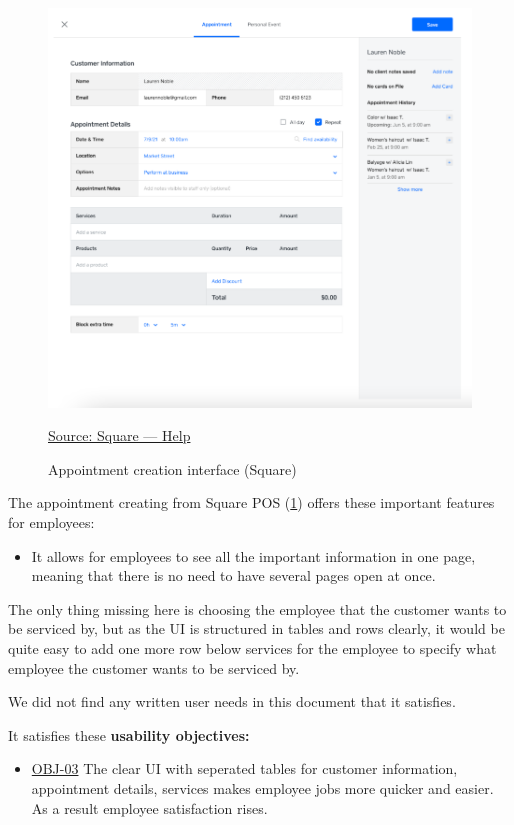 \documentclass[]{VUMIFTemplateClass}
\begin{document}
\begin{figure}[H]
    \centering
    \includegraphics[width=\textwidth]{images/examples/appointment_creating_square.png}
    \caption{Appointment creation interface (Square)}
    \href{https://squareup.com/help/us/en}{Source: Square — Help}
    \label{fig:appointment-creation}
\end{figure}

The appointment creating from Square POS (\ref{fig:appointment-creation}) offers these important features for employees:

\begin{itemize}
    \item It allows for employees to see all the important information in one page, meaning that there is no need to have several pages open at once.
\end{itemize}

The only thing missing here is choosing the employee that the customer wants to be serviced by, but as the UI is structured in tables and rows clearly, it would be quite easy to add one more row below services for the employee to specify what employee the customer wants to be serviced by. 

We did not find any written user needs in this document that it satisfies.

It satisfies these \textbf{usability objectives:}
\begin{itemize}
    \item \hyperref[OBJ-03]{OBJ-03} The clear UI with seperated tables for customer information, appointment details, services makes employee jobs more quicker and easier. As a result employee satisfaction rises.
\end{itemize}
\end{document}
